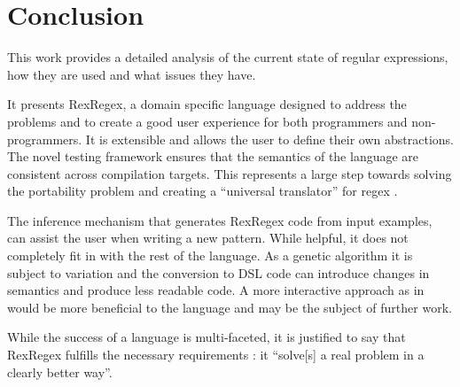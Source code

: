 
\chapter{Conclusion}

This work provides a detailed analysis of the current state of regular expressions, how they are used and what issues they have.

It presents RexRegex, a domain specific language designed to address the problems and to create a good user experience for both programmers and non-programmers. It is extensible and allows the user to define their own abstractions. The novel testing framework \utgast{} ensures that the semantics of the language are consistent across compilation targets. This represents a large step towards solving the portability problem and creating a \enquote{universal translator} for regex \cite{RegexNotLinguaFranca}.

The inference mechanism that generates RexRegex code from input examples, can assist the user when writing a new pattern. While helpful, it does not completely fit in with the rest of the language. As a genetic algorithm it is subject to variation and the conversion to DSL code can introduce changes in semantics and produce less readable code. A more interactive approach as in \cite{noxoneRegexGenerator} would be more beneficial to the language and may be the subject of further work.

While the success of a language is multi-faceted, it is justified to say that RexRegex fulfills the necessary requirements \cite{OnSuccessfulLanuageDesignKernighan}: it \enquote{solve[s] a real problem in a clearly better way}.

